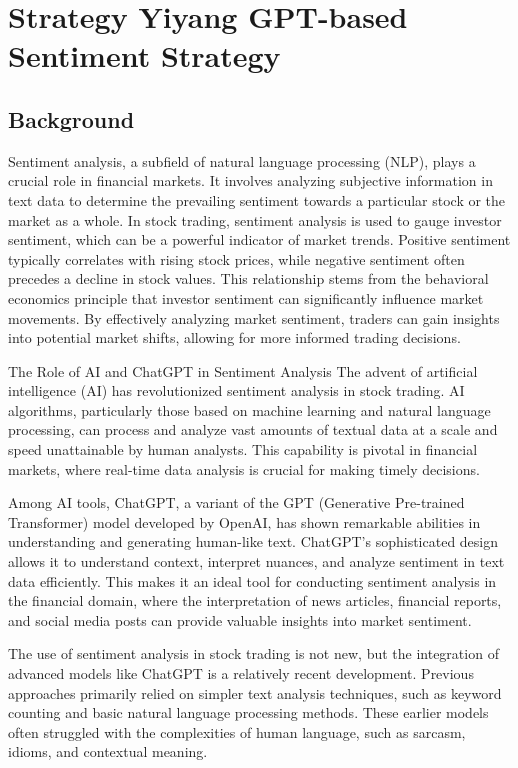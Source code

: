 \chapter{Strategy Yiyang GPT-based Sentiment Strategy}

\section{Background}

Sentiment analysis, a subfield of natural language processing (NLP), plays a crucial role in financial markets. It involves analyzing subjective information in text data to determine the prevailing sentiment towards a particular stock or the market as a whole. In stock trading, sentiment analysis is used to gauge investor sentiment, which can be a powerful indicator of market trends. Positive sentiment typically correlates with rising stock prices, while negative sentiment often precedes a decline in stock values. This relationship stems from the behavioral economics principle that investor sentiment can significantly influence market movements. By effectively analyzing market sentiment, traders can gain insights into potential market shifts, allowing for more informed trading decisions.

The Role of AI and ChatGPT in Sentiment Analysis
The advent of artificial intelligence (AI) has revolutionized sentiment analysis in stock trading. AI algorithms, particularly those based on machine learning and natural language processing, can process and analyze vast amounts of textual data at a scale and speed unattainable by human analysts. This capability is pivotal in financial markets, where real-time data analysis is crucial for making timely decisions.

Among AI tools, ChatGPT, a variant of the GPT (Generative Pre-trained Transformer) model developed by OpenAI, has shown remarkable abilities in understanding and generating human-like text. ChatGPT's sophisticated design allows it to understand context, interpret nuances, and analyze sentiment in text data efficiently. This makes it an ideal tool for conducting sentiment analysis in the financial domain, where the interpretation of news articles, financial reports, and social media posts can provide valuable insights into market sentiment.

The use of sentiment analysis in stock trading is not new, but the integration of advanced models like ChatGPT is a relatively recent development. Previous approaches primarily relied on simpler text analysis techniques, such as keyword counting and basic natural language processing methods. These earlier models often struggled with the complexities of human language, such as sarcasm, idioms, and contextual meaning.

